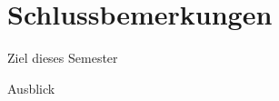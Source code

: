 
\section{Schlussbemerkungen}

\begin{frame}{Ziel dieses Semester}
\end{frame}

\begin{frame}{Ausblick}

\end{frame}

